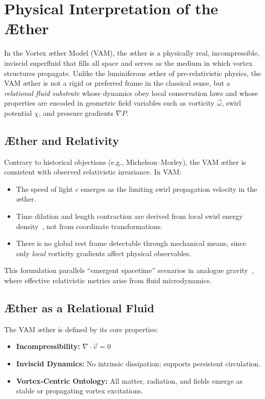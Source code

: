 \section{Physical Interpretation of the Æther}\label{sec:aether-interpretation}

In the Vortex \ae ther Model (VAM), the \ae ther is a physically real, incompressible, inviscid superfluid that fills all space and serves as the medium in which vortex structures propagate. Unlike the luminiferous æther of pre-relativistic physics, the VAM æther is not a rigid or preferred frame in the classical sense, but a \emph{relational fluid substrate} whose dynamics obey local conservation laws and whose properties are encoded in geometric field variables such as vorticity $\vec{\omega}$, swirl potential $\chi$, and pressure gradients $\nabla P$.

\subsection{Æther and Relativity}

Contrary to historical objections (e.g., Michelson--Morley), the VAM æther is consistent with observed relativistic invariance. In VAM:

\begin{itemize}
    \item The speed of light $c$ emerges as the limiting swirl propagation velocity in the æther.
    \item Time dilation and length contraction are derived from local swirl energy density~\cite{iskandarani2025b}, not from coordinate transformations.
    \item There is no global rest frame detectable through mechanical means, since only \emph{local} vorticity gradients affect physical observables.
\end{itemize}

This formulation parallels “emergent spacetime” scenarios in analogue gravity~\cite{barcelo2011}, where effective relativistic metrics arise from fluid microdynamics.

\subsection{Æther as a Relational Fluid}

The VAM æther is defined by its core properties:
\begin{itemize}
    \item \textbf{Incompressibility:} $\nabla \cdot \vec{v} = 0$
    \item \textbf{Inviscid Dynamics:} No intrinsic dissipation; supports persistent circulation.
    \item \textbf{Vortex-Centric Ontology:} All matter, radiation, and fields emerge as stable or propagating vortex excitations.
\end{itemize}

